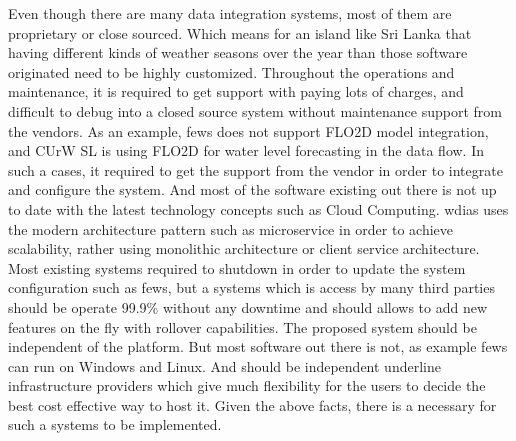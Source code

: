Even though there are many data integration systems, most of them are proprietary or close sourced. Which means for an island like Sri Lanka that having different kinds of weather seasons over the year than those software originated need to be highly customized. Throughout the operations and maintenance, it is required to get support with paying lots of charges, and difficult to debug into a closed source system without maintenance support from the vendors. As an example, \acrshort{fews} does not support FLO2D model integration, and CUrW SL is using FLO2D for water level forecasting in the data flow. In such a cases, it required to get the support from the vendor in order to integrate and configure the system.
And most of the software existing out there is not up to date with the latest technology concepts such as Cloud Computing. \acrfull{wdias} uses the modern architecture pattern such as microservice in order to achieve scalability, rather using monolithic architecture or client service architecture. Most existing systems required to shutdown in order to update the system configuration such as \acrshort{fews}, but a systems which is access by many third parties should be operate 99.9\% without any downtime and should allows to add new features on the fly with rollover capabilities. The proposed system should be independent of the platform. But most software out there is not, as example \acrshort{fews} can run on Windows and Linux. And should be independent underline infrastructure providers which give much flexibility for the users to decide the best cost effective way to host it. Given the above facts, there is a necessary for such a systems to be implemented.
